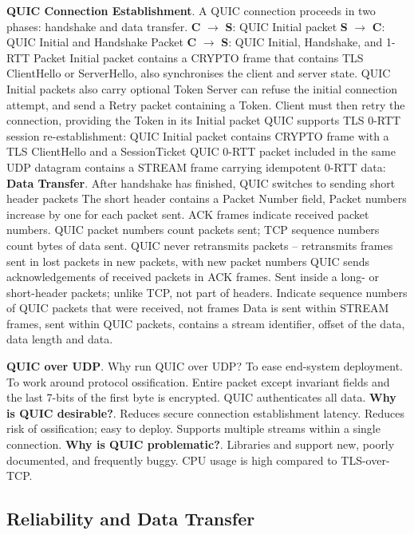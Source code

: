 \documentclass{article}
\begin{document}
\noindent \textbf{QUIC Connection Establishment}. A QUIC connection proceeds in two phases: handshake and data transfer.
\textbf{C} $\rightarrow$ \textbf{S}: QUIC Initial packet
\textbf{S} $\rightarrow$ \textbf{C}: QUIC Initial and Handshake Packet
\textbf{C} $\rightarrow$ \textbf{S}: QUIC Initial, Handshake, and 1-RTT Packet
Initial packet contains a CRYPTO frame that contains TLS ClientHello or ServerHello, also synchronises the client and server state.
QUIC Initial packets also carry optional Token Server can refuse the initial connection attempt,
and send a Retry packet containing a Token.
Client must then retry the connection, providing the Token in its Initial packet
QUIC supports TLS 0-RTT session re-establishment: QUIC Initial packet contains CRYPTO frame with a TLS ClientHello
and a SessionTicket QUIC 0-RTT packet included in the same UDP datagram contains a STREAM frame carrying idempotent 0-RTT data:
\textbf{Data Transfer}. After handshake has finished, QUIC switches to sending short header packets
The short header contains a Packet Number field, Packet numbers increase by one for each packet sent.
ACK frames indicate received packet numbers. QUIC packet numbers count packets sent; TCP sequence numbers count bytes of data sent.
QUIC never retransmits packets – retransmits frames sent in lost packets in new packets, with new packet numbers
QUIC sends acknowledgements of received packets in ACK frames.
Sent inside a long- or short-header packets; unlike TCP, not part of headers.
Indicate sequence numbers of QUIC packets that were received, not frames
Data is sent within STREAM frames, sent within QUIC packets, contains a stream identifier, offset of the data, data length and data.

\noindent \textbf{QUIC over UDP}. Why run QUIC over UDP? To ease end-system deployment.
To work around protocol ossification.
Entire packet except invariant fields and the last 7-bits of the first byte is encrypted.
QUIC authenticates all data.
\textbf{Why is QUIC desirable?}.
Reduces secure connection establishment latency.
Reduces risk of ossification; easy to deploy.
Supports multiple streams within a single connection.
\textbf{Why is QUIC problematic?}.
Libraries and support new, poorly documented, and frequently buggy.
CPU usage is high compared to TLS-over-TCP.


\subsection*{Reliability and Data Transfer}
\end{document}
